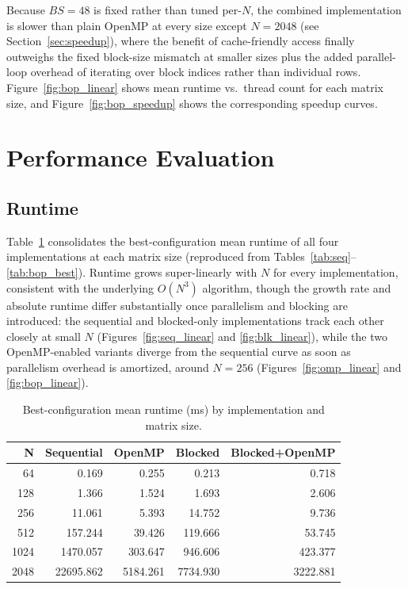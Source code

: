 \documentclass[11pt]{article}
\begin{document}
Because $BS=48$ is fixed rather than tuned per-$N$, the combined implementation is slower than plain OpenMP at every size except $N=2048$ (see Section~\ref{sec:speedup}), where the benefit of cache-friendly access finally outweighs the fixed block-size mismatch at smaller sizes plus the added parallel-loop overhead of iterating over block indices rather than individual rows. Figure~\ref{fig:bop_linear} shows mean runtime vs.\ thread count for each matrix size, and Figure~\ref{fig:bop_speedup} shows the corresponding speedup curves.




\section{Performance Evaluation}
\label{sec:evaluation}

\subsection{Runtime}
\label{sec:runtime}

Table~\ref{tab:runtime_summary} consolidates the best-configuration mean runtime of all four implementations at each matrix size (reproduced from Tables~\ref{tab:seq}--\ref{tab:bop_best}). Runtime grows super-linearly with $N$ for every implementation, consistent with the underlying $O(N^3)$ algorithm, though the growth rate and absolute runtime differ substantially once parallelism and blocking are introduced: the sequential and blocked-only implementations track each other closely at small $N$ (Figures~\ref{fig:seq_linear} and \ref{fig:blk_linear}), while the two OpenMP-enabled variants diverge from the sequential curve as soon as parallelism overhead is amortized, around $N=256$ (Figures~\ref{fig:omp_linear} and \ref{fig:bop_linear}).

\begin{table}[h]
\centering
\caption{Best-configuration mean runtime (ms) by implementation and matrix size.}
\label{tab:runtime_summary}
\begin{tabular}{rrrrr}
\toprule
\textbf{N} & \textbf{Sequential} & \textbf{OpenMP} & \textbf{Blocked} & \textbf{Blocked+OpenMP} \\
\midrule
64   & 0.169     & 0.255    & 0.213    & 0.718    \\
128  & 1.366     & 1.524    & 1.693    & 2.606    \\
256  & 11.061    & 5.393    & 14.752   & 9.736    \\
512  & 157.244   & 39.426   & 119.666  & 53.745   \\
1024 & 1470.057  & 303.647  & 946.606  & 423.377  \\
2048 & 22695.862 & 5184.261 & 7734.930 & 3222.881 \\
\bottomrule
\end{tabular}
\end{table}
\end{document}

